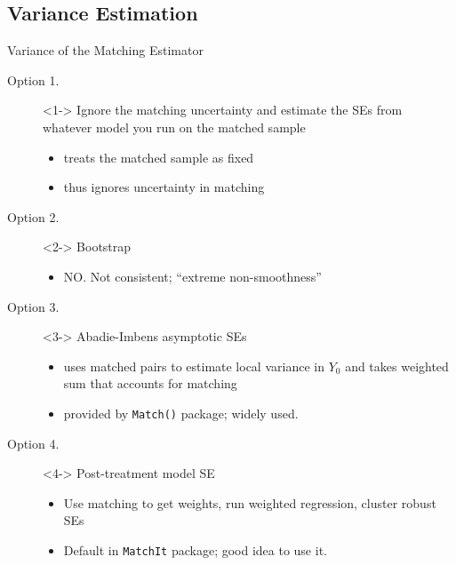 \documentclass[xcolor=dvipsnames]{beamer}
\begin{document}
\subsection{Variance Estimation}
\begin{frame}{Variance of the Matching Estimator}
\begin{description}
\item[Option 1.]<1-> Ignore the matching uncertainty and estimate the SEs from whatever model you run on the matched sample
\begin{itemize}
\small
\item treats the matched sample as fixed
\item thus ignores uncertainty in matching
\end{itemize}
\bigskip
\item[Option 2.]<2-> Bootstrap
\begin{itemize}
\small
\item \alert{NO}. Not consistent; ``extreme non-smoothness''
\end{itemize}
\bigskip
\item[Option 3.]<3-> Abadie-Imbens asymptotic SEs
\begin{itemize}
\small
\item uses matched pairs to estimate local variance in $Y_0$ and takes weighted sum that accounts for matching
\item provided by \texttt{Match()} package; widely used.
\end{itemize}
\bigskip
\item[Option 4.]<4-> Post-treatment model SE
\begin{itemize}
\small
\item Use matching to get weights, run weighted regression, cluster robust SEs
\item Default in \texttt{MatchIt} package; good idea to use it.
\end{itemize}
\end{description}
\end{frame}
\end{document}
